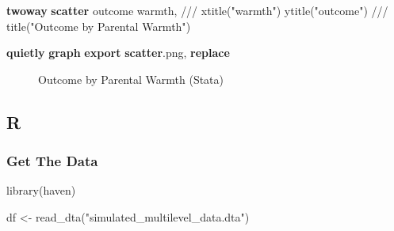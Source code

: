 \documentclass[
  letterpaper,
  DIV=11,
  numbers=noendperiod]{scrreprt}
\newenvironment{Shaded}{\begin{snugshade}}{\end{snugshade}}
\newcommand{\BaseNTok}[1]{\textcolor[rgb]{0.68,0.00,0.00}{#1}}
\newcommand{\CommentTok}[1]{\textcolor[rgb]{0.37,0.37,0.37}{#1}}
\newcommand{\FunctionTok}[1]{\textcolor[rgb]{0.28,0.35,0.67}{#1}}
\newcommand{\KeywordTok}[1]{\textcolor[rgb]{0.00,0.23,0.31}{\textbf{#1}}}
\newcommand{\NormalTok}[1]{\textcolor[rgb]{0.00,0.23,0.31}{#1}}
\newcommand{\OtherTok}[1]{\textcolor[rgb]{0.00,0.23,0.31}{#1}}
\newcommand{\StringTok}[1]{\textcolor[rgb]{0.13,0.47,0.30}{#1}}
\begin{document}
\begin{Shaded}
\begin{Highlighting}[]
\KeywordTok{twoway} \KeywordTok{scatter}\NormalTok{ outcome warmth, }\CommentTok{///}
  \BaseNTok{xtitle}\NormalTok{(}\StringTok{"warmth"}\NormalTok{) }\BaseNTok{ytitle}\NormalTok{(}\StringTok{"outcome"}\NormalTok{) }\CommentTok{///}
  \BaseNTok{title}\NormalTok{(}\StringTok{"Outcome by Parental Warmth"}\NormalTok{) }

\KeywordTok{quietly} \KeywordTok{graph} \KeywordTok{export} \KeywordTok{scatter}\NormalTok{.png, }\KeywordTok{replace}
\end{Highlighting}
\end{Shaded}

\begin{figure}


\caption{\label{fig-Stata}Outcome by Parental Warmth (Stata)}

\end{figure}%

\subsection{R}

\subsubsection{Get The Data}\label{get-the-data-1}

\begin{Shaded}
\begin{Highlighting}[]
\FunctionTok{library}\NormalTok{(haven)}

\NormalTok{df }\OtherTok{\textless{}{-}} \FunctionTok{read\_dta}\NormalTok{(}\StringTok{"simulated\_multilevel\_data.dta"}\NormalTok{)}
\end{Highlighting}
\end{Shaded}
\end{document}
